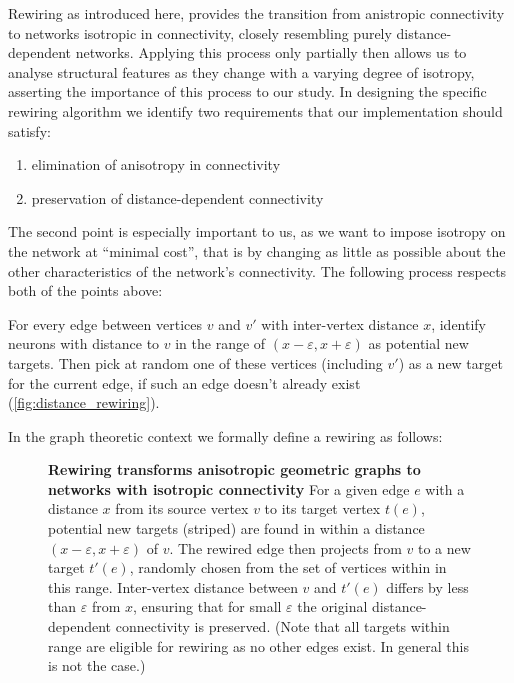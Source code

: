 Rewiring as introduced here, provides the transition from anistropic
connectivity to networks isotropic in connectivity, closely resembling
purely distance-dependent networks. Applying this process only
partially then allows us to analyse structural features as they change with
a varying degree of isotropy, asserting the importance of this process
to our study. In designing the specific rewiring algorithm we identify
two requirements that our implementation should satisfy: 
\begin{enumerate}
  \itemsep-11pt
  \item elimination of anisotropy in connectivity 
  \item preservation of distance-dependent connectivity
\end{enumerate}
The second point is especially important to us, as we want to impose
isotropy on the network at \enquote{minimal cost}, that is by changing
as little as possible about the other characteristics of the network's
connectivity. The following process respects both of the points above:
\begin{blockquote}{
For every edge between vertices $v$ and $v'$ with inter-vertex
distance $x$, identify neurons with distance to $v$ in the range of
$(x-\varepsilon, x+\varepsilon)$ as potential new targets. Then pick
at random one of these vertices (including $v'$) as a new target for
the current edge, if such an edge doesn't already exist
(\autoref{fig:distance_rewiring}).}
\end{blockquote}
In the graph theoretic context we
formally define a rewiring as follows:

\vspace{0.2cm}
\begin{figure}[H]
  \centering 
  \caption{\textbf{Rewiring transforms anisotropic geometric graphs to
      networks with isotropic connectivity} For a given edge $e$ with
    a distance $x$ from its source vertex $v$ to its target vertex
    $t(e)$, potential new targets (striped) are found in within a
    distance $(x-\varepsilon, x+\varepsilon)$ of $v$. The rewired edge
    then projects from $v$ to a new target $t'(e)$, randomly chosen
    from the set of vertices within in this range. Inter-vertex
    distance between $v$ and $t'(e)$ differs by less than
    $\varepsilon$ from $x$, ensuring that for small $\varepsilon$ the
    original distance-dependent connectivity is preserved. (Note that
    all targets within range are eligible for rewiring as no other
    edges exist. In general this is not the case.)}
  \label{fig:distance_rewiring}
\end{figure}


